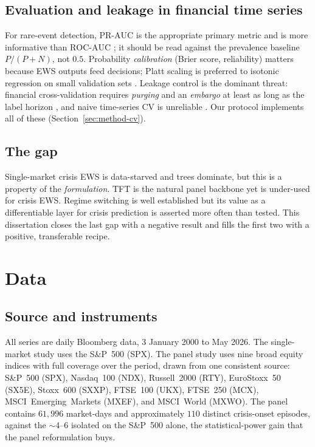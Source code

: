 \documentclass[11pt,a4paper]{article}
\newcommand{\prauc}{\mbox{PR-AUC}}
\newcommand{\rocauc}{\mbox{ROC-AUC}}
\begin{document}
\subsection{Evaluation and leakage in financial time series}
For rare-event detection, $\prauc$ is the appropriate primary metric and is
more informative than $\rocauc$
\citep{saito2015prc,davisgoadrich2006}; it should be read against the
prevalence baseline $P/(P{+}N)$, not $0.5$. Probability \emph{calibration}
(Brier score, reliability) matters because EWS outputs feed decisions; Platt
scaling is preferred to isotonic regression on small validation sets
\citep{niculescu2005calibration}. Leakage control is the dominant threat:
financial cross-validation requires \emph{purging} and an \emph{embargo} at
least as long as the label horizon \citep{lopezdeprado2018}, and naive
time-series CV is unreliable \citep{bergmeir2012cv}. Our protocol implements
all of these (Section~\ref{sec:method-cv}).

\subsection{The gap}
Single-market crisis EWS is data-starved and trees dominate, but this is a
property of the \emph{formulation}. TFT is the natural panel backbone yet is
under-used for crisis EWS. Regime switching is well established but its value
as a differentiable layer for crisis prediction is asserted more often than
tested. This dissertation closes the last gap with a negative result and
fills the first two with a positive, transferable recipe.

\section{Data}
\label{sec:data}

\subsection{Source and instruments}
All series are daily Bloomberg data, 3 January 2000 to May 2026. The
single-market study uses the S\&P~500 (SPX). The panel study uses nine broad
equity indices with full coverage over the period, drawn from one consistent
source: S\&P~500 (SPX), Nasdaq~100 (NDX), Russell~2000 (RTY),
EuroStoxx~50 (SX5E), Stoxx~600 (SXXP), FTSE~100 (UKX), FTSE~250 (MCX),
MSCI~Emerging~Markets (MXEF), and MSCI~World (MXWO). The panel contains
$61{,}996$ market-days and approximately $110$ distinct crisis-onset episodes,
against the $\sim$4--6 isolated on the S\&P~500 alone, the statistical-power
gain that the panel reformulation buys.
\end{document}
